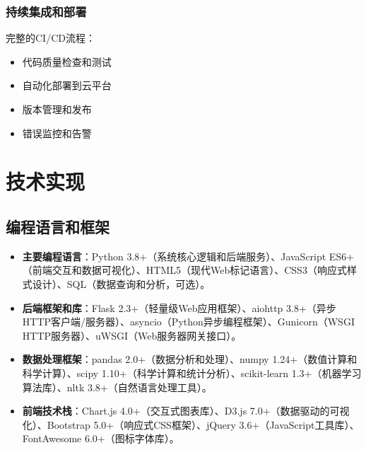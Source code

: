 \documentclass[12pt,a4paper]{article}
\begin{document}
\subsubsection{持续集成和部署}
完整的CI/CD流程：
\begin{itemize}
    \item 代码质量检查和测试
    \item 自动化部署到云平台
    \item 版本管理和发布
    \item 错误监控和告警
\end{itemize}

\section{技术实现}

\subsection{编程语言和框架}
\begin{itemize}
    \item \textbf{主要编程语言}：Python 3.8+（系统核心逻辑和后端服务）、JavaScript ES6+（前端交互和数据可视化）、HTML5（现代Web标记语言）、CSS3（响应式样式设计）、SQL（数据查询和分析，可选）。
    
    \item \textbf{后端框架和库}：Flask 2.3+（轻量级Web应用框架）、aiohttp 3.8+（异步HTTP客户端/服务器）、asyncio（Python异步编程框架）、Gunicorn（WSGI HTTP服务器）、uWSGI（Web服务器网关接口）。
    
    \item \textbf{数据处理框架}：pandas 2.0+（数据分析和处理）、numpy 1.24+（数值计算和科学计算）、scipy 1.10+（科学计算和统计分析）、scikit-learn 1.3+（机器学习算法库）、nltk 3.8+（自然语言处理工具）。
    
    \item \textbf{前端技术栈}：Chart.js 4.0+（交互式图表库）、D3.js 7.0+（数据驱动的可视化）、Bootstrap 5.0+（响应式CSS框架）、jQuery 3.6+（JavaScript工具库）、FontAwesome 6.0+（图标字体库）。
\end{itemize}
\end{document}
